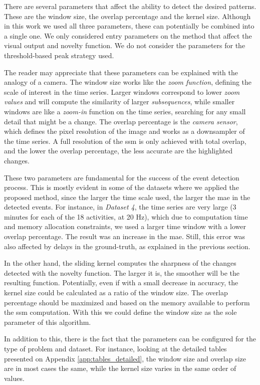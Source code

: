 There are several parameters that affect the ability to detect the desired patterns. These are the window size, the overlap percentage and the kernel size. Although in this work we used all three parameters, these can potentially be combined into a single one. We only considered entry parameters on the method that affect the visual output and novelty function. We do not consider the parameters for the threshold-based peak strategy used.
\par
The reader may appreciate that these parameters can be explained with the analogy of a camera. The window size works like the \textit{zoom function}, defining the scale of interest in the time series. Larger windows correspond to lower \textit{zoom values} and will compute the similarity of larger \textit{subsequences}, while smaller windows are like a \textit{zoom-in} function on the time series, searching for any small detail that might be a change. The overlap percentage is the \textit{camera sensor}, which defines the pixel resolution of the image and works as a downsampler of the time series. A full resolution of the \gls{ssm} is only achieved with total overlap, and the lower the overlap percentage, the less accurate are the highlighted changes.
\par
These two parameters are fundamental for the success of the event detection process. This is mostly evident in some of the datasets where we applied the proposed method, since the larger the time scale used, the larger the \gls{mae} in the detected events. For instance, in \textit{Dataset 4}, the time series are very large (3 minutes for each of the 18 activities, at 20 Hz), which due to computation time and memory allocation constraints, we used a larger time window with a lower overlap percentage. The result was an increase in the \gls{mae}. Still, this error was also affected by delays in the ground-truth, as explained in the previous section.
\par
In the other hand, the sliding kernel computes the sharpness of the changes detected with the novelty function. The larger it is, the smoother will be the resulting function. Potentially, even if with a small decrease in accuracy, the kernel size could be calculated as a ratio of the window size. The overlap percentage should be maximized and based on the memory available to perform the \gls{ssm} computation. With this we could define the window size as the sole parameter of this algorithm.
\par
In addition to this, there is the fact that the parameters can be configured for the type of problem and dataset. For instance, looking at the detailed tables presented on Appendix \ref{app:tables_detailed}, the window size and overlap size are in most cases the same, while the kernel size varies in the same order of values.
